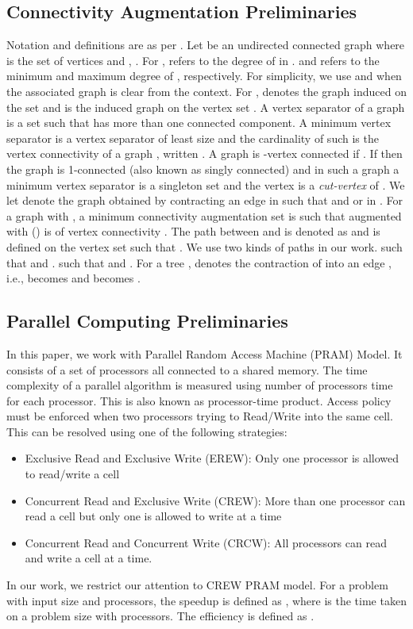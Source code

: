 \documentclass[runningheads]{llncs}
\begin{document}
\subsection{Connectivity Augmentation Preliminaries}
Notation and definitions are as per \cite{golu,west}.  Let  be an undirected connected graph where  is the set of vertices and , . For ,  refers to the degree of  in .   and  refers to the minimum and maximum degree of , respectively.  For simplicity, we use  and  when the associated graph is clear from the context. For ,  denotes the graph induced on the set  and  is the induced graph on the vertex set .  A vertex separator of a graph  is a set  such that  has more than one connected component.  A minimum vertex separator  is a vertex separator  of least size and the cardinality of such  is the vertex connectivity of a graph , written  .  A graph is -vertex connected if .  If  then the graph is 1-connected (also known as singly connected) and in such a graph a minimum vertex separator  is a singleton set and the vertex  is a {\em cut-vertex} of . We let  denote the graph obtained by contracting an edge  in  such that  and  or  in .  For a graph  with , a minimum connectivity augmentation set  is such that  augmented with  () is of vertex connectivity .  The path between  and  is denoted as  and is defined on the vertex set  such that .   We use two kinds of paths in our work.   such that  and .  such that  and .  For a tree ,   denotes the contraction of  into an edge , i.e.,  becomes  and  becomes .
\subsection{Parallel Computing Preliminaries}
In this paper, we work with Parallel Random Access Machine (PRAM) Model.  It consists of a set of  processors all connected to a shared memory.  The time complexity of a parallel algorithm is measured using number of processors  time for each processor.  This is also known as processor-time product.  Access policy must be enforced when two processors trying to Read/Write  into the same cell. This can be resolved using one of the following strategies:
\begin{itemize}
\item Exclusive Read and Exclusive Write (EREW): Only one processor is allowed to read/write a cell
\item Concurrent Read and Exclusive Write (CREW): More than one processor can read a cell but only one is allowed to write at a time
\item Concurrent Read and Concurrent Write (CRCW): All processors can read and write a cell at a time.
\end{itemize}
In our work, we restrict our attention to CREW PRAM model.  For a problem with input size  and  processors,  the speedup is defined as , where  is the time taken on a problem size  with  processors.  The efficiency is defined as .
\end{document}
